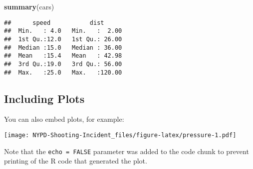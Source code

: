 \documentclass[
]{article}
\newenvironment{Shaded}{\begin{snugshade}}{\end{snugshade}}
\newcommand{\FunctionTok}[1]{\textcolor[rgb]{0.13,0.29,0.53}{\textbf{#1}}}
\newcommand{\NormalTok}[1]{#1}
\begin{document}
\begin{Shaded}
\begin{Highlighting}[]
\FunctionTok{summary}\NormalTok{(cars)}
\end{Highlighting}
\end{Shaded}

\begin{verbatim}
##      speed           dist       
##  Min.   : 4.0   Min.   :  2.00  
##  1st Qu.:12.0   1st Qu.: 26.00  
##  Median :15.0   Median : 36.00  
##  Mean   :15.4   Mean   : 42.98  
##  3rd Qu.:19.0   3rd Qu.: 56.00  
##  Max.   :25.0   Max.   :120.00
\end{verbatim}

\hypertarget{including-plots}{%
\subsection{Including Plots}\label{including-plots}}

You can also embed plots, for example:

\texttt{[image: NYPD-Shooting-Incident\_files/figure-latex/pressure-1.pdf]}

Note that the \texttt{echo\ =\ FALSE} parameter was added to the code
chunk to prevent printing of the R code that generated the plot.
\end{document}
